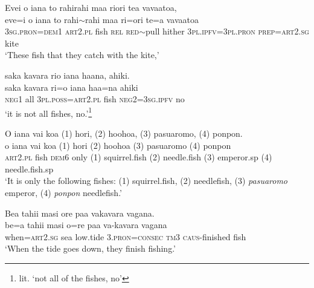 \ea\label{ex:text27-23}
Evei o iana to rahirahi maa riori tea vavaatoa,\\
\gll eve=i	o	iana	to	rahi{$\sim$}rahi	maa	ri=ori	te=a	vavaatoa\\
     3\textsc{sg}.\textsc{pron}=\textsc{dem}1	\textsc{art}2.\textsc{pl}	fish	\textsc{rel}	\textsc{red}{$\sim$}pull	hither	3\textsc{pl}.\textsc{ipfv}=3\textsc{pl}.\textsc{pron}	\textsc{prep}=\textsc{art}2.\textsc{sg}	kite\\
\glt `These fish that they catch with the kite,'
\z

\ea\label{ex:text27-24}
saka kavara rio iana haana, ahiki.\\
\gll saka	kavara	ri=o	iana	haa=na	ahiki\\
     \textsc{neg}1	all	3\textsc{pl}.\textsc{poss}=\textsc{art}2.\textsc{pl}	fish	\textsc{neg}2=3\textsc{sg}.\textsc{ipfv}	no\\
\glt `it is not all fishes, no.'\footnote{lit. `not all of the fishes, no'}
\z

\ea\label{ex:text27-25}
O iana vai koa (1) hori, (2) hoohoa, (3) pasuaromo, (4) ponpon.\\
\gll o	iana	vai	koa	(1)	hori	(2)	hoohoa	(3)	pasuaromo	(4)	ponpon\\
     \textsc{art}2.\textsc{pl}	fish	\textsc{dem}6	only	(1)	squirrel.fish	(2)	needle.fish	(3)	emperor.sp	(4)	needle.fish.sp\\
\glt `It is only the following fishes: (1) squirrel.fish, (2) needlefish, (3) \textit{pasuaromo} emperor, (4) \textit{ponpon} needlefish.'
\z

\ea\label{ex:text27-26}
Bea tahii masi ore paa vakavara vagana.\\
\gll be=a	tahii	masi	o=re	paa	va-kavara	vagana\\
     when=\textsc{art}2.\textsc{sg}	sea	low.tide	3.\textsc{pron}=\textsc{consec}	\textsc{tm}3	\textsc{caus}-finished	fish\\
\glt `When the tide goes down, they finish fishing.'
\z
